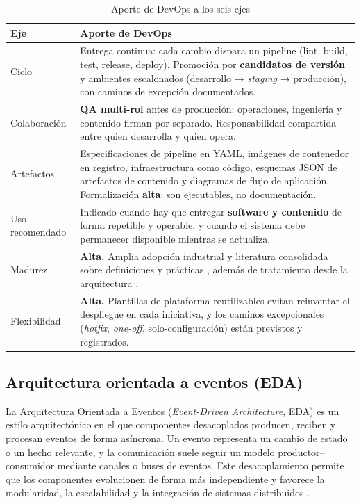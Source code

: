 \documentclass[conference]{IEEEtran}
\begin{document}
\begin{table}[!t]
\centering
\footnotesize
\caption{Aporte de DevOps a los seis ejes}
\begin{tabular}{p{}p{}}
\hline
\textbf{Eje} & \textbf{Aporte de DevOps} \\ \hline
Ciclo & Entrega continua: cada cambio dispara un pipeline (lint, build, test, release, deploy). Promoción por \textbf{candidatos de versión} y ambientes escalonados (desarrollo → \textit{staging} → producción), con caminos de excepción documentados. \\ \hline
Colaboración & \textbf{QA multi-rol} antes de producción: operaciones, ingeniería y contenido firman por separado. Responsabilidad compartida entre quien desarrolla y quien opera. \\ \hline
Artefactos & Especificaciones de pipeline en YAML, imágenes de contenedor en registro, infraestructura como código, esquemas JSON de artefactos de contenido y diagramas de flujo de aplicación. Formalización \textbf{alta}: son ejecutables, no documentación. \\ \hline
Uso recomendado & Indicado cuando hay que entregar \textbf{software y contenido} de forma repetible y operable, y cuando el sistema debe permanecer disponible mientras se actualiza. \\ \hline
Madurez & \textbf{Alta.} Amplia adopción industrial y literatura consolidada sobre definiciones y prácticas \cite{Jabbari2016}, además de tratamiento desde la arquitectura \cite{Bass2015}. \\ \hline
Flexibilidad & \textbf{Alta.} Plantillas de plataforma reutilizables evitan reinventar el despliegue en cada iniciativa, y los caminos excepcionales (\textit{hotfix}, \textit{one-off}, solo-configuración) están previstos y registrados. \\ \hline
\end{tabular}
\end{table}

\subsection{Arquitectura orientada a eventos (EDA)}

La Arquitectura Orientada a Eventos (\textit{Event-Driven Architecture}, EDA) es un estilo arquitectónico en el que componentes desacoplados producen, reciben y procesan eventos de forma asíncrona. Un evento representa un cambio de estado o un hecho relevante, y la comunicación suele seguir un modelo productor–consumidor mediante canales o buses de eventos. Este desacoplamiento permite que los componentes evolucionen de forma más independiente y favorece la modularidad, la escalabilidad y la integración de sistemas distribuidos \cite{Cabane2024}.
\end{document}
